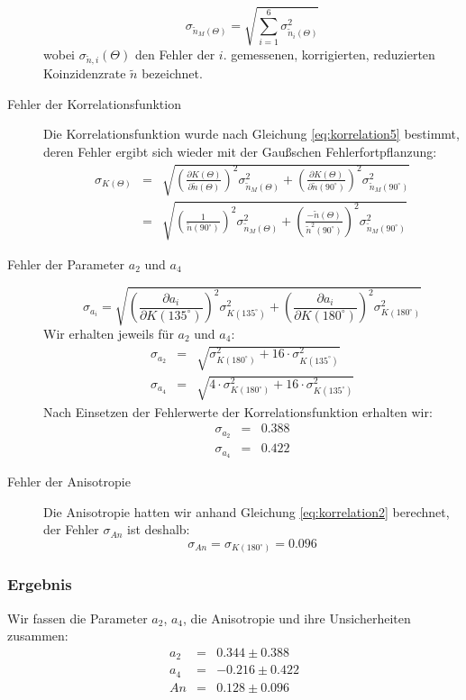 \documentclass[a4paper,titlepage]{scrartcl}
\numberwithin{equation}{section}
\begin{document}
\begin{description}
\begin{equation*}
\sigma_{\tilde{n}_M(\Theta)}=\sqrt{\sum_{i=1}^6 \sigma^2_{\tilde{n}_i(\Theta)}}
\end{equation*}
wobei $\sigma_{\tilde{n},i}(\Theta)$ den Fehler der $i$. gemessenen, korrigierten, reduzierten Koinzidenzrate $\tilde{n}$ bezeichnet.
\item[Fehler der Korrelationsfunktion] Die Korrelationsfunktion wurde nach Gleichung \ref{eq:korrelation5} bestimmt, deren Fehler ergibt sich wieder mit der Gaußschen Fehlerfortpflanzung:
\begin{eqnarray*}
\sigma_{K(\Theta)}&=&\sqrt{\left(\frac{\partial K(\Theta)}{\partial \tilde{n}(\Theta)}\right)^2 \sigma^2_{\tilde{n}_M(\Theta)}+\left(\frac{\partial K(\Theta)}{\partial \tilde{n}(90^{\circ})}\right)^2 \sigma^2_{\tilde{n}_M(90^{\circ})}}\\
&=&\sqrt{\left( \frac{1}{\tilde{n}(90^{\circ})} \right)^2 \sigma^2_{\tilde{n}_M(\Theta)} + \left( \frac{- \tilde{n} (\Theta)}{\tilde{n}^2 (90^{\circ})} \right)^2 \sigma_{\tilde{n}_M(90^{\circ})}^2}
\end{eqnarray*}
\item[Fehler der Parameter $a_2$ und $a_4$]
\begin{equation*}
\sigma_{a_i}=\sqrt{\left(\frac{\partial a_i}{\partial K(135^{\circ})}\right)^2 \sigma^2_{K(135^{\circ})} + \left(\frac{\partial a_i}{\partial K(180^{\circ})}\right)^2 \sigma^2_{K(180^{\circ})}}
\end{equation*}
Wir erhalten jeweils für $a_2$ und $a_4$:
\begin{eqnarray*}
\sigma_{a_2}&=&\sqrt{\sigma^2_{K(180^{\circ})} + 16 \cdot \sigma^2_{K(135^{\circ})}}\\
\sigma_{a_4}&=&\sqrt{4 \cdot \sigma^2_{K(180^{\circ})} + 16 \cdot \sigma^2_{K(135^{\circ})}}
\end{eqnarray*}
Nach Einsetzen der Fehlerwerte der Korrelationsfunktion erhalten wir:
\begin{eqnarray*}
\sigma_{a_2}&=&0.388\\
\sigma_{a_4}&=&0.422
\end{eqnarray*}
\item[Fehler der Anisotropie] Die Anisotropie hatten wir anhand Gleichung \ref{eq:korrelation2} berechnet, der Fehler $\sigma_{An}$ ist deshalb:
\begin{equation*}
\sigma_{An}=\sigma_{K(180^{\circ})}=0.096
\end{equation*}
\end{description}
\subsubsection{Ergebnis}
Wir fassen die Parameter $a_2$, $a_4$, die Anisotropie und ihre Unsicherheiten zusammen:
\begin{eqnarray*}
a_2&=&0.344 \pm 0.388\\
a_4&=&-0.216 \pm 0.422\\
An&=&0.128 \pm 0.096
\end{eqnarray*}
\end{document}
